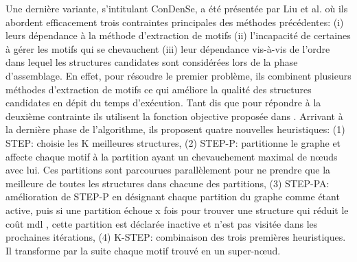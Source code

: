 Une dernière variante,
 s'intitulant \gls{ConDenSe}, a été présentée par Liu et al. \citep{liu2018reducing} où ils abordent efficacement trois contraintes principales des  méthodes précédentes: 
				(i) leurs dépendance à la méthode d'extraction de motifs 
				(ii) l'incapacité de certaines à gérer les motifs qui se chevauchent 
				(iii) leur dépendance vis-à-vis de l'ordre dans lequel les structures candidates sont considérées lors de la phase d'assemblage. En effet, pour résoudre le premier problème, ils combinent plusieurs méthodes d'extraction de motifs ce qui améliore la qualité des structures candidates en dépit  du temps d'exécution. Tant dis que pour répondre à la deuxième contrainte ils utilisent la fonction objective proposée dans \citep{liu2015empirical}. Arrivant à la dernière phase de l'algorithme, ils proposent quatre nouvelles heuristiques: 
				(1) STEP: choisie les K  meilleures structures, 
				(2) STEP-P: partitionne le graphe et affecte chaque motif  à la partition ayant un chevauchement maximal de nœuds avec lui. Ces partitions sont parcourues parallèlement pour ne prendre que la meilleure de toutes les structures dans chacune des partitions,
				(3) STEP-PA: amélioration de STEP-P en désignant chaque partition du graphe comme étant active, puis si une partition échoue x fois pour trouver une structure qui réduit le coût \gls{mdl} , cette partition est déclarée inactive et n'est pas visitée dans les prochaines itérations,
				 (4) K-STEP: combinaison des trois premières heuristiques. Il transforme par la suite chaque motif trouvé en un super-nœud.		
